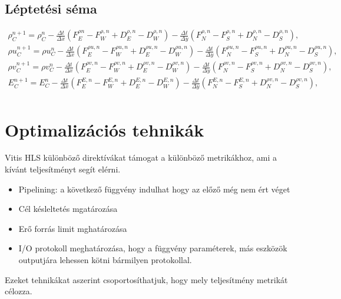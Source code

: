 \documentclass{article}
\begin{document}
\subsection{Léptetési séma}
\begin{equation}
    \begin{split}
        \rho^{n+1}_{C}=\rho^{n}_{C}-\frac{\Delta t}{\Delta x}(F^{\rho n}_{E}-F^{\rho ,n}_{W}+D^{\rho ,n}_{E}-D^{\rho ,n}_{W})-\frac{\Delta t}{\Delta y}(F^{\rho ,n}_{N}-F^{\rho ,n}_{S}+D^{\rho ,n}_{N}-D^{\rho ,n}_{S}), \\
        
                \rho u^{n+1}_{C}=\rho u^{n}_{C}-\frac{\Delta t}{\Delta x}(F^{\rho u ,n}_{E}-F^{\rho u,n}_{W}+D^{\rho u,n}_{E}-D^{\rho u,n}_{W})-\frac{\Delta t}{\Delta y}(F^{\rho u,n}_{N}-F^{\rho u,n}_{S}+D^{\rho u,n}_{N}-D^{\rho u,n}_{S}), \\
                
                \rho v^{n+1}_{C}=\rho v^{n}_{C}-\frac{\Delta t}{\Delta x}(F^{\rho v ,n}_{E}-F^{\rho v,n}_{W}+D^{\rho v,n}_{E}-D^{\rho v,n}_{W})-\frac{\Delta t}{\Delta y}(F^{\rho v,n}_{N}-F^{\rho v,n}_{S}+D^{\rho v,n}_{N}-D^{\rho v,n}_{S}), \\
                
                E^{n+1}_{C}=E^{n}_{C}-\frac{\Delta t}{\Delta x}(F^{E ,n}_{E}-F^{E,n}_{W}+D^{E,n}_{E}-D^{E,n}_{W})-\frac{\Delta t}{\Delta y}(F^{E,n}_{N}-F^{E,n}_{S}+D^{\rho v,n}_{N}-D^{\rho v,n}_{S}), \\
    \end{split}
\end{equation}

\section{Optimalizációs tehnikák}
\cite{hls} \cite{optim} Vitis HLS különböző direktívákat támogat a különböző metrikákhoz, ami a kívánt teljesítményt segít elérni.
\begin{itemize}
    \item Pipelining: a következő függvény indulhat hogy az előző még nem ért véget
    \item Cél késleltetés mgatározása
    \item Erő forrás limit mghatározása
    \item I/O protokoll meghatározása, hogy a függvény paraméterek, más eszközök outputjára lehessen kötni bármilyen protokollal. 
\end{itemize}
Ezeket  tehnikákat aszerint csoportosíthatjuk, hogy mely teljesítmény metrikát célozza.
\end{document}
